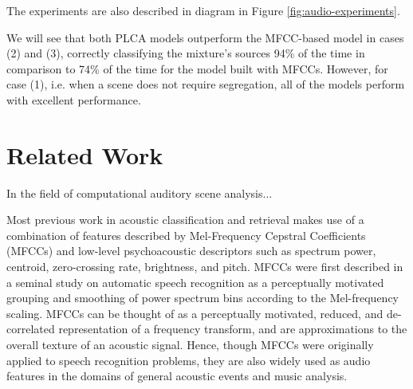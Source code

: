 \documentclass[a4paper,10pt,final]{ThesisStyle}
\begin{document}
The experiments are also described in diagram in Figure \ref{fig:audio-experiments}.

We will see that both PLCA models outperform the MFCC-based model in cases (2) and (3), correctly classifying the mixture's sources 94\% of the time in comparison to 74\% of the time for the model built with MFCCs.  However, for case (1), i.e. when a scene does not require segregation, all of the models perform with excellent performance. 

\section{Related Work}

In the field of computational auditory scene analysis...

Most previous work in acoustic classification and retrieval makes use of a combination of features described by Mel-Frequency Cepstral Coefficients (MFCCs) and low-level psychoacoustic descriptors \cite{Temko2007,Guo2003a,McKinney2003,Allamanche2001} such as spectrum power, centroid, zero-crossing rate, brightness, and pitch.  MFCCs were first described in a seminal study on automatic speech recognition \cite{Davis1980} as a perceptually motivated grouping and smoothing of power spectrum bins according to the Mel-frequency scaling.  MFCCs can be thought of as a perceptually motivated, reduced, and de-correlated representation of a frequency transform, and are approximations to the overall texture of an acoustic signal.  Hence, though MFCCs were originally applied to speech recognition problems, they are also widely used as audio features in the domains of general acoustic events \cite{Temko2007} and music \cite{Pampalk2006a,McKinney2003} analysis.  



\end{document}
